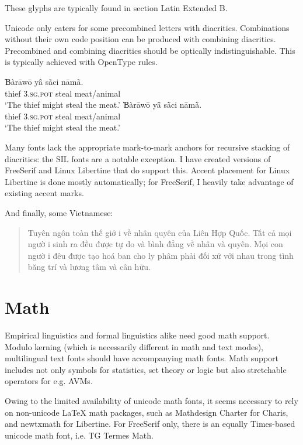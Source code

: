 \documentclass[12pt,a4paper]{article}
\begin{document}
These glyphs are typically found in section Latin Extended B. 

Unicode only caters for some precombined letters with
diacritics. Combinations without their own code position can be
produced with combining diacritics. Precombined and combining
diacritics should be optically indistinguishable. This is typically
achieved with OpenType rules. 

\begin{exe}
  \ex \gll Ɓàrāwō yā̂ sā̀ci nāmā̀. \\
  thief \textsc{3.sg.pot} steal meat/animal\\
  \glt `The thief might steal the meat.'
  \ex \gll Ɓàrāwō yā̂ sā̀ci nāmā̀. \\
  thief \textsc{3.sg.pot} steal meat/animal\\
  \glt `The thief might steal the meat.'
\end{exe}

Many fonts lack the appropriate mark-to-mark anchors for recursive
stacking of diacritics: the SIL fonts are a notable exception.  I have
created versions of FreeSerif and Linux Libertine that do support
this. Accent placement for Linux Libertine is done mostly
automatically; for FreeSerif, I heavily take advantage of existing
accent marks.



And finally, some Vietnamese: 
\begin{quotation}
  Tuyên ngôn toàn thế giớ i về nhân quyên của Liên Hợp Quốc.
  Tất cả mọi ngườ i sinh ra đều được tự do và bình đẳng về nhân và
  quyên.  Mọi con ngườ i đêu được tạo hoá ban cho ly phâm phải đối xử
  với nhau trong tình băng trí và lương tâm và cân hữu.
\end{quotation}

\section{Math}

Empirical linguistics and formal linguistics alike need good math
support. Modulo kerning (which is necessarily different in math and
text modes), multilingual text fonts should have accompanying math
fonts. Math support includes not only symbols for statistics, set
theory or logic but also stretchable operators for e.g. AVMs. 

Owing to the limited availability of unicode math fonts, it seems
necessary to rely on non-unicode LaTeX math packages, such as
Mathdesign Charter for Charis, and newtxmath for Libertine. For
FreeSerif only, there is an equally Times-based unicode math font,
i.e. TG Termes Math. 
\end{document}
